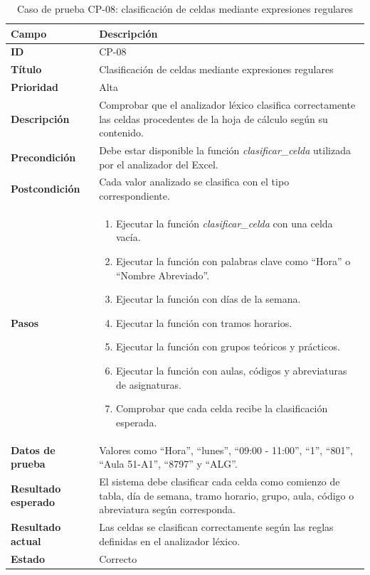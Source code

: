 \begin{table}[H]
	\centering
	\small
	\renewcommand{\arraystretch}{1.2}
	\begin{tabularx}{\textwidth}{@{}p{3.5cm}X@{}}
		\toprule
		\textbf{Campo} & \textbf{Descripción} \\
		\midrule
		\textbf{ID} & CP-08 \\
		\textbf{Título} & Clasificación de celdas mediante expresiones regulares \\
		\textbf{Prioridad} & Alta \\
		\textbf{Descripción} & Comprobar que el analizador léxico clasifica correctamente las celdas procedentes de la hoja de cálculo según su contenido. \\
		\textbf{Precondición} & Debe estar disponible la función \textit{clasificar\_celda} utilizada por el analizador del Excel. \\
		\textbf{Postcondición} & Cada valor analizado se clasifica con el tipo correspondiente. \\
		\textbf{Pasos} &
		\begin{enumerate}
			\item Ejecutar la función \textit{clasificar\_celda} con una celda vacía.
			\item Ejecutar la función con palabras clave como ``Hora'' o ``Nombre Abreviado''.
			\item Ejecutar la función con días de la semana.
			\item Ejecutar la función con tramos horarios.
			\item Ejecutar la función con grupos teóricos y prácticos.
			\item Ejecutar la función con aulas, códigos y abreviaturas de asignaturas.
			\item Comprobar que cada celda recibe la clasificación esperada.
		\end{enumerate} \\
		\textbf{Datos de prueba} & Valores como ``Hora'', ``lunes'', ``09:00 - 11:00'', ``1'', ``801'', ``Aula 51-A1'', ``8797'' y ``ALG''. \\
		\textbf{Resultado esperado} & El sistema debe clasificar cada celda como comienzo de tabla, día de semana, tramo horario, grupo, aula, código o abreviatura según corresponda. \\
		\textbf{Resultado actual} & Las celdas se clasifican correctamente según las reglas definidas en el analizador léxico. \\
		\textbf{Estado} & Correcto \\
		\bottomrule
	\end{tabularx}
	\caption{Caso de prueba CP-08: clasificación de celdas mediante expresiones regulares}
	\label{tab}
\end{table}

